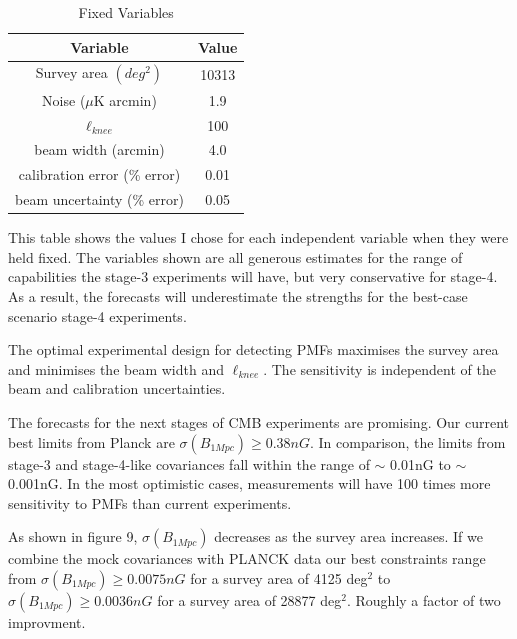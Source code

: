 \begin{table}[h]
\centering
\caption{Fixed Variables}

\label{my-label}
\begin{tabular}{l|l}
\multicolumn{1}{c}{Variable} & \multicolumn{1}{|c}{Value} \\ \hline
\multicolumn{1}{c}{Survey area $(deg^2)$} & \multicolumn{1}{|c}{10313}  \\
\multicolumn{1}{c}{Noise ($\mu$K arcmin)} & \multicolumn{1}{|c}{1.9}   \\
\multicolumn{1}{c}{$\ell_{knee}$} & \multicolumn{1}{|c}{100} \\
\multicolumn{1}{c}{beam width (arcmin)} & \multicolumn{1}{|c}{4.0}   \\
\multicolumn{1}{c}{calibration error (\% error)} & \multicolumn{1}{|c}{0.01} \\
\multicolumn{1}{c}{beam uncertainty (\% error)} & \multicolumn{1}{|c}{0.05}
\end{tabular}
\begin{flushleft}
This table shows the values I chose for each independent variable when they were held fixed. The variables shown are all generous estimates for the range of capabilities the stage-3 experiments will have, but very conservative for stage-4. As a result, the forecasts will underestimate the strengths for the best-case scenario stage-4 experiments.
\end{flushleft}
\end{table}

The optimal experimental design for detecting PMFs maximises the survey area and minimises the beam width and $\ell_{knee}$. The sensitivity is independent of the beam and calibration uncertainties. 

The forecasts for the next stages of CMB experiments are promising. Our current best limits from Planck are $\sigma(B_{1Mpc}) \geq 0.38nG$. In comparison, the limits from stage-3 and stage-4-like covariances fall within the range of $\sim$ 0.01nG to $\sim$ 0.001nG. In the most optimistic cases, measurements will have 100 times more sensitivity to PMFs than current experiments.

As shown in figure 9, $\sigma(B_{1Mpc})$ decreases as the survey area increases. If we combine the mock covariances with PLANCK data our best constraints range from $\sigma(B_{1Mpc}) \geq 0.0075nG$ for a survey area of 4125 deg$^2$ to $\sigma(B_{1Mpc}) \geq 0.0036nG$ for a survey area of 28877 deg$^2$. Roughly a factor of two improvment.



